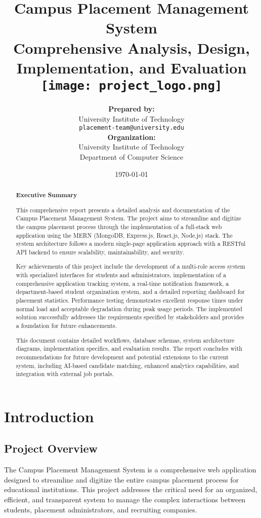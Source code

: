 \documentclass[12pt,a4paper]{report}
\title{
    \vspace{-1.5cm}
    \LARGE \textbf{Campus Placement Management System}\\
    \vspace{0.5cm}
    \large Comprehensive Analysis, Design, Implementation, and Evaluation\\
    \vspace{1.5cm}
    \texttt{[image: project\_logo.png]}\\
    \vspace{1.5cm}
}
\author{
    \textbf{Prepared by:}\\
    University Institute of Technology\\
    \texttt{placement-team@university.edu}\\
    \vspace{0.5cm}
    \textbf{Organization:}\\
    University Institute of Technology\\
    Department of Computer Science
}
\date{\today}
\begin{document}
\maketitle
\thispagestyle{empty}

\begin{abstract}
    \begin{center}
        \large\textbf{Executive Summary}
    \end{center}
    This comprehensive report presents a detailed analysis and documentation of the Campus Placement Management System. The project aims to streamline and digitize the campus placement process through the implementation of a full-stack web application using the MERN (MongoDB, Express.js, React.js, Node.js) stack. The system architecture follows a modern single-page application approach with a RESTful API backend to ensure scalability, maintainability, and security.
    
    Key achievements of this project include the development of a multi-role access system with specialized interfaces for students and administrators, implementation of a comprehensive application tracking system, a real-time notification framework, a department-based student organization system, and a detailed reporting dashboard for placement statistics. Performance testing demonstrates excellent response times under normal load and acceptable degradation during peak usage periods. The implemented solution successfully addresses the requirements specified by stakeholders and provides a foundation for future enhancements.
    
    This document contains detailed workflows, database schemas, system architecture diagrams, implementation specifics, and evaluation results. The report concludes with recommendations for future development and potential extensions to the current system, including AI-based candidate matching, enhanced analytics capabilities, and integration with external job portals.
\end{abstract}

\tableofcontents
\listoffigures
\listoftables
\newpage

\chapter{Introduction}
\section{Project Overview}
The Campus Placement Management System is a comprehensive web application designed to streamline and digitize the entire campus placement process for educational institutions. This project addresses the critical need for an organized, efficient, and transparent system to manage the complex interactions between students, placement administrators, and recruiting companies.
\end{document}
